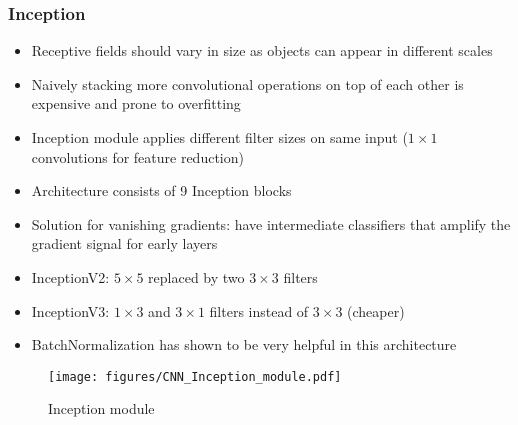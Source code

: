 \subsubsection{Inception}
\begin{itemize}
	\item Receptive fields should vary in size as objects can appear in different scales
	\item Naively stacking more convolutional operations on top of each other is expensive and prone to overfitting
	\item Inception module applies different filter sizes on same input ($1\times 1$ convolutions for feature reduction)
	\item Architecture consists of 9 Inception blocks
	\item Solution for vanishing gradients: have intermediate classifiers that amplify the gradient signal for early layers
	\item InceptionV2: $5\times 5$ replaced by two $3\times 3$ filters
	\item InceptionV3: $1\times 3$ and $3\times 1$ filters instead of $3\times 3$ (cheaper)
	\item BatchNormalization has shown to be very helpful in this architecture
\end{itemize}
\begin{figure}[ht!]
	\centering
	\texttt{[image: figures/CNN\_Inception\_module.pdf]}
	\caption{Inception module}
	\label{fig:CNN_Inception_module}
\end{figure}
